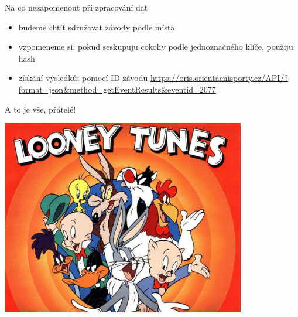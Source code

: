 \documentclass{beamer}
\begin{document}
\begin{frame}{Na co nezapomenout při zpracování dat}
  \begin{itemize}
    \item budeme chtít sdružovat závody podle místa
    \item vzpomeneme si: pokud seskupuju cokoliv podle jednoznačného klíče, použiju hash
    \item získání výsledků: pomocí ID závodu \url{https://oris.orientacnisporty.cz/API/?format=json&method=getEventResults&eventid=2077}
  \end{itemize}
\end{frame}

\begin{frame}{A to je vše, přátelé!}
  \begin{center}
    \includegraphics[width=0.8\textwidth]{looney_tunes}
  \end{center}
\end{frame}
\end{document}
